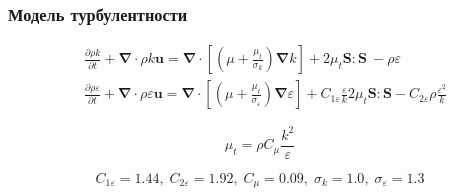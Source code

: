 \documentclass[10pt,xcolor={dvipsnames,table},aspectratio=169]{beamer}
\begin{document}
    \begin{frame}{}

        \justifying
        \normalsize

        \frametitle{Модель турбулентности}

        \[
            \begin{aligned}
                &\frac{\partial \rho k}{\partial t}
                + \symbf{\nabla} \cdot \rho k \symbf{u}
                =
                \symbf{\nabla} \cdot \left[ \left(\mu + \frac{\mu_{t}}{\sigma_k} \right) \symbf{\nabla} k \right]
                + 2 \mu_{t} \symbf{S} \colon \symbf{S} \ - \rho \varepsilon  \\
                &\frac{\partial \rho \varepsilon}{\partial t}
                + \symbf{\nabla} \cdot \rho \varepsilon \symbf{u}
                =
                \symbf{\nabla} \cdot \left[\left(\mu + \frac{\mu_{t}}{\sigma_{\varepsilon}} \right) \symbf{\nabla} \varepsilon \right]
                + C_{1 \varepsilon} \frac{\varepsilon}{k} 2 \mu_{t} \symbf{S} \colon \symbf{S} - C_{2 \varepsilon} \rho \frac{\varepsilon^2}{k}
            \end{aligned}
        \]

        \[
            \mu_{t} = \rho C_{\mu} \frac{k^{2}}{\varepsilon}
        \]

        \[
            C_{1 \varepsilon} = 1.44, \; C_{2 \varepsilon} = 1.92, \; C_{\mu} = 0.09, \; \sigma_{k} = 1.0, \; \sigma_{\varepsilon} = 1.3
        \]

    \end{frame}
\end{document}
